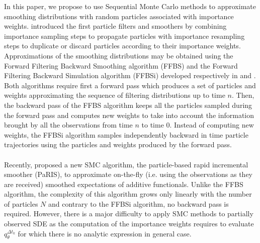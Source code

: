 \documentclass[12pt]{article}
\newcommand{\1}{\mathrm{1}}
\begin{document}
In this paper, we propose to use Sequential Monte Carlo methods to approximate smoothing distributions with random particles associated with importance weights.
 \cite{gordon:salmond:smith:1993,kitagawa:1996} introduced the first particle filters and smoothers by combining importance sampling steps to propagate particles with importance resampling steps to duplicate or discard particles according to their importance weights.  
 Approximations of the smoothing distributions may be obtained using the Forward Filtering Backward Smoothing algorithm (FFBS) and  the Forward Filtering Backward Simulation algorithm (FFBSi) developed respectively in \cite{kitagawa:1996,huerzeler:kunsch:1998,doucet:godsill:andrieu:2000} and \cite{godsill:doucet:west:2004}. 
 Both algorithms require first a forward pass which produces a set of particles and weights approximating the sequence of filtering distributions up to time $n$. 
 Then, the backward pass of the FFBS algorithm keeps all the particles sampled during the forward pass and computes new weights to take into account the information brought by all the observations from time $n$ to time $0$. 
 Instead of computing new weights, the FFBSi  algorithm samples independently backward in time particle trajectories using the particles and weights produced by the forward pass.\\ 
\\
Recently, \cite{olsson:westerborn:2016} proposed a new SMC algorithm, the particle-based rapid incremental smoother (PaRIS), to approximate on-the-fly (i.e. using the observations as they are received) smoothed expectations of additive functionals.
 Unlike the FFBS algorithm, the complexity of this algorithm grows only linearly with the number of particles $N$ and contrary to the FFBSi algorithm, no backward pass is required. 
 However, there is a major difficulty to apply SMC methods to partially observed SDE as the computation of the importance weights requires to evaluate $q^{\Delta t_k}_{\theta}$ for which there is no analytic expression in general case.
\end{document}
